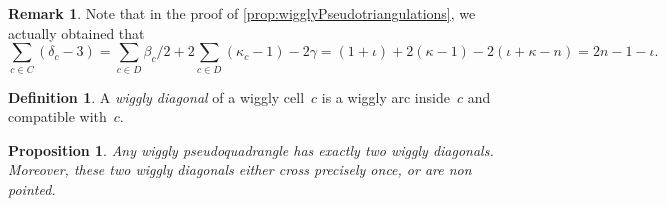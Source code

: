 \documentclass{amsart}
\newtheorem{proposition}[theorem]{Proposition}
\theoremstyle{definition}
\newtheorem{definition}[theorem]{Definition}
\newtheorem{remark}[theorem]{Remark}
\newcommand{\darkblue}{\color{darkblue}} %
\newcommand{\defn}[1]{\textsl{\darkblue #1}} %
\begin{document}
\begin{remark}
Note that in the proof of \cref{prop:wigglyPseudotriangulations}, we actually obtained that
\[
\sum_{c \in C} (\delta_c-3) = \sum_{c \in D} \beta_c/2 + 2 \sum_{c \in D} (\kappa_c-1) - 2\gamma = (1+\iota) + 2(\kappa-1) - 2(\iota+\kappa-n) = 2n-1-\iota.
\]
\end{remark}

\begin{definition}
A \defn{wiggly diagonal} of a wiggly cell~$c$ is a wiggly arc inside~$c$ and compatible with~$c$.
\end{definition}

\begin{proposition}
\label{prop:diagonalsPseudoquadrangle}
Any wiggly pseudoquadrangle has exactly two wiggly diagonals.
Moreover, these two wiggly diagonals either cross precisely once, or are non pointed.
\end{proposition}
\end{document}
